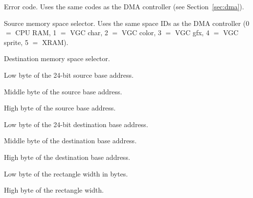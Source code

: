

Error code.  Uses the same codes as the DMA controller (see
Section~\ref{sec:dma}).



Source memory space selector.  Uses the same space IDs as the DMA controller
(0 $=$ CPU RAM, 1 $=$ VGC char, 2 $=$ VGC color, 3 $=$ VGC gfx, 4 $=$ VGC
sprite, 5 $=$ XRAM).


Destination memory space selector.



Low byte of the 24-bit source base address.


Middle byte of the source base address.


High byte of the source base address.



Low byte of the 24-bit destination base address.


Middle byte of the destination base address.


High byte of the destination base address.



Low byte of the rectangle width in bytes.


High byte of the rectangle width.


